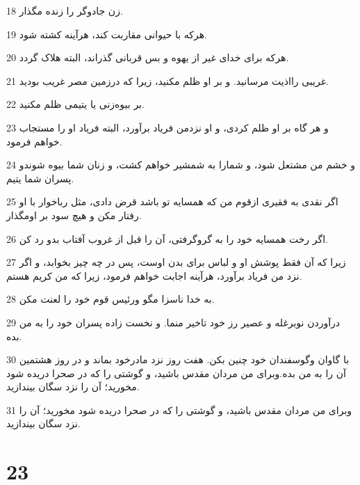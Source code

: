 \par 18 زن جادوگر را زنده مگذار.
\par 19 هر‌که با حیوانی مقاربت کند، هرآینه کشته شود.
\par 20 هر‌که برای خدای غیر از یهوه و بس قربانی گذراند، البته هلاک گردد.
\par 21 غریبی رااذیت مرسانید. و بر او ظلم مکنید، زیرا که درزمین مصر غریب بودید.
\par 22 بر بیوه‌زنی یا یتیمی ظلم مکنید.
\par 23 و هر گاه بر او ظلم کردی، و او نزدمن فریاد برآورد، البته فریاد او را مستجاب خواهم فرمود.
\par 24 و خشم من مشتعل شود، و شمارا به شمشیر خواهم کشت، و زنان شما بیوه شوندو پسران شما یتیم.
\par 25 اگر نقدی به فقیری ازقوم من که همسایه تو باشد قرض دادی، مثل رباخوار با او رفتار مکن و هیچ سود بر اومگذار.
\par 26 اگر رخت همسایه خود را به گروگرفتی، آن را قبل از غروب آفتاب بدو رد کن.
\par 27 زیرا که آن فقط پوشش او و لباس برای بدن اوست، پس در چه چیز بخوابد، و اگر نزد من فریاد برآورد، هرآینه اجابت خواهم فرمود، زیرا که من کریم هستم.
\par 28 به خدا ناسزا مگو ورئیس قوم خود را لعنت مکن.
\par 29 درآوردن نوبرغله و عصیر رز خود تاخیر منما. و نخست زاده پسران خود را به من بده.
\par 30 با گاوان وگوسفندان خود چنین بکن. هفت روز نزد مادرخود بماند و در روز هشتمین آن را به من بده.وبرای من مردان مقدس باشید، و گوشتی را که در صحرا دریده شود مخورید؛ آن را نزد سگان بیندازید.
\par 31 وبرای من مردان مقدس باشید، و گوشتی را که در صحرا دریده شود مخورید؛ آن را نزد سگان بیندازید.
 
\chapter{23}

